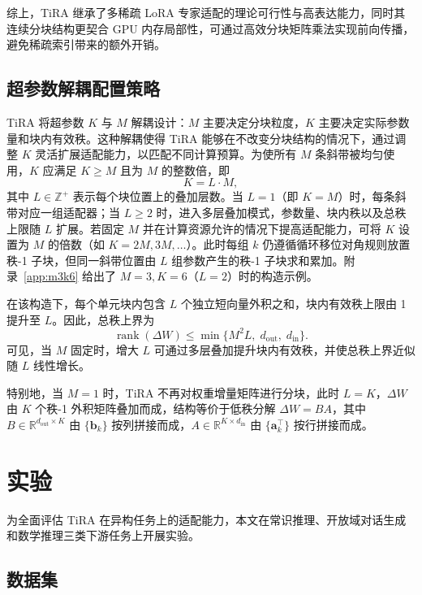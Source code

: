 \documentclass[UTF8,a4paper,11pt]{ctexart}
\newcommand{\R}{\mathbb{R}}
\newcommand{\DeltaW}{\Delta W}
\newcommand{\rank}{\operatorname{rank}}
\begin{document}
综上，TiRA 继承了多稀疏 LoRA 专家适配的理论可行性与高表达能力，同时其连续分块结构更契合 GPU 内存局部性，可通过高效分块矩阵乘法实现前向传播，避免稀疏索引带来的额外开销。

\subsection{超参数解耦配置策略}

TiRA 将超参数 $K$ 与 $M$ 解耦设计：$M$ 主要决定分块粒度，$K$ 主要决定实际参数量和块内有效秩。这种解耦使得 TiRA 能够在不改变分块结构的情况下，通过调整 $K$ 灵活扩展适配能力，以匹配不同计算预算。为使所有 $M$ 条斜带被均匀使用，$K$ 应满足 $K\geq M$ 且为 $M$ 的整数倍，即
\begin{equation}
    K=L\cdot M,
\end{equation}
其中 $L\in\mathbb{Z}^{+}$ 表示每个块位置上的叠加层数。当 $L=1$（即 $K=M$）时，每条斜带对应一组适配器；当 $L\geq2$ 时，进入多层叠加模式，参数量、块内秩以及总秩上限随 $L$ 扩展。若固定 $M$ 并在计算资源允许的情况下提高适配能力，可将 $K$ 设置为 $M$ 的倍数（如 $K=2M,3M,\ldots$）。此时每组 $k$ 仍遵循循环移位对角规则放置秩-1 子块，但同一斜带位置由 $L$ 组参数产生的秩-1 子块求和累加。附录~\ref{app:m3k6} 给出了 $M=3,K=6$（$L=2$）时的构造示例。

在该构造下，每个单元块内包含 $L$ 个独立短向量外积之和，块内有效秩上限由 1 提升至 $L$。因此，总秩上界为
\begin{equation}
    \rank(\DeltaW)\leq \min\{M^2L,\;d_{\mathrm{out}},\;d_{\mathrm{in}}\}.
\end{equation}
可见，当 $M$ 固定时，增大 $L$ 可通过多层叠加提升块内有效秩，并使总秩上界近似随 $L$ 线性增长。

特别地，当 $M=1$ 时，TiRA 不再对权重增量矩阵进行分块，此时 $L=K$，$\DeltaW$ 由 $K$ 个秩-1 外积矩阵叠加而成，结构等价于低秩分解 $\DeltaW=BA$，其中 $B\in\R^{d_{\mathrm{out}}\times K}$ 由 $\{\bm{b}_k\}$ 按列拼接而成，$A\in\R^{K\times d_{\mathrm{in}}}$ 由 $\{\bm{a}_k^{\top}\}$ 按行拼接而成。

\section{实验}

为全面评估 TiRA 在异构任务上的适配能力，本文在常识推理、开放域对话生成和数学推理三类下游任务上开展实验。

\subsection{数据集}
\end{document}
